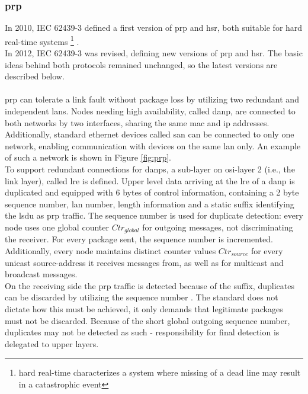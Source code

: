 \subsubsection{\gls{prp}}
In 2010, IEC 62439-3 defined a first version of {\gls{prp}} and \gls{hsr}, both suitable for hard real-time
systems \footnote{hard real-time characterizes a system where missing of a dead line may result in a catastrophic event} \cite{4416946}.
\\
In 2012, IEC 62439-3 was revised, defining new versions of \gls{prp} and \gls{hsr}. The basic ideas behind both protocols remained
unchanged, so the latest versions are described below.
\\
\\
\gls{prp} can tolerate a link fault without package loss by utilizing two redundant and independent \glspl{lan}.
Nodes needing high availability, called \gls{danp}, are connected to both networks by two interfaces, sharing the same \gls{mac} and \gls{ip} addresses.
Additionally, standard ethernet devices called \gls{san} can be connected to only one network, enabling communication with devices on the same \gls{lan} only.
An example of such a network is shown in Figure \ref{fig:prp}.
\\
To support redundant connections for \glspl{danp}, a sub-layer on \gls{osi}-layer 2 (i.e., the link layer), called \gls{lre} is defined. 
Upper level data arriving at the \gls{lre} of a \gls{danp} is duplicated and equipped with 6 bytes of control information, containing a 2 byte sequence number,
\gls{lan} number, length information and a static suffix identifying the \gls{lsdu} as \gls{prp} traffic. The sequence number is used for duplicate detection: 
every node uses one global counter $Ctr_{global}$ for outgoing messages, not discriminating the receiver. For every package sent, the sequence number is incremented.
Additionally, every node maintains distinct counter values $Ctr_{source}$ for every unicast source-address it receives messages from, as well as for multicast
and broadcast messages.
\\
On the receiving side the \gls{prp} traffic is detected because of the suffix, duplicates can be discarded by utilizing the sequence number \cite{6699852}.
The standard does not dictate how this must be achieved, it only demands that legitimate packages must not be discarded. Because of the short global outgoing 
sequence number, duplicates may not be detected as such - responsibility for final detection is delegated to upper layers.
